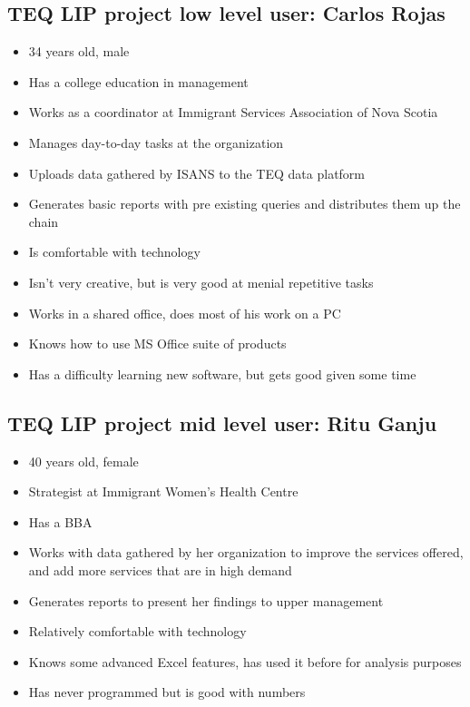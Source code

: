 \documentclass[]{scrreprt}
\begin{document}
\subsection{TEQ LIP project low level user: Carlos Rojas}
\begin{itemize}
	\item 34 years old, male
	\item Has a college education in management
	\item Works as a coordinator at Immigrant Services Association of Nova Scotia
	\item Manages day-to-day tasks at the organization
	\item Uploads data gathered by ISANS to the TEQ data platform
	\item Generates basic reports with pre existing queries and distributes them up the chain
	\item Is comfortable with technology
	\item Isn't very creative, but is very good at menial repetitive tasks
	\item Works in a shared office, does most of his work on a PC
	\item Knows how to use MS Office suite of products
	\item Has a difficulty learning new software, but gets good given some time
\end{itemize}

\subsection{TEQ LIP project mid level user: Ritu Ganju}
\begin{itemize}
	\item 40 years old, female
	\item Strategist at Immigrant Women’s Health Centre
	\item Has a BBA
	\item Works with data gathered by her organization to improve the services offered, and add more services that are in high demand
	\item Generates reports to present her findings to upper management
	\item Relatively comfortable with technology
	\item Knows some advanced Excel features, has used it before for analysis purposes
	\item Has never programmed but is good with numbers
\end{itemize}
\end{document}
